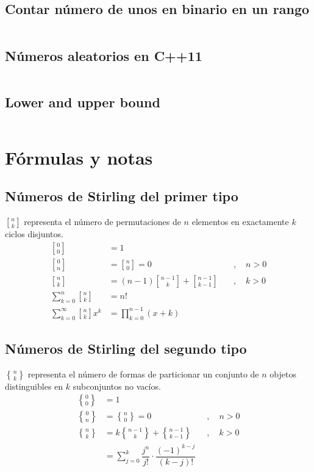 \documentclass[11pt]{article}
\newcommand{\genstirlingI}[3]{%
	\genfrac{[}{]}{0pt}{#1}{#2}{#3}%
}
\newcommand{\genstirlingII}[3]{%
	\genfrac{\{}{\}}{0pt}{#1}{#2}{#3}%
}
\newcommand{\stirlingI}[2]{\genstirlingI{}{#1}{#2}}
\newcommand{\stirlingII}[2]{\genstirlingII{}{#1}{#2}}
\begin{document}
		\subsection{Contar número de unos en binario en un rango}
		\inputminted[tabsize=2,breaklines,firstline=158,lastline=165,fontsize=\small]{c++}{misc.cpp}
		
		\subsection{Números aleatorios en C++11}
		\inputminted[tabsize=2,breaklines,firstline=167,lastline=180,fontsize=\small]{c++}{misc.cpp}
		
		\subsection{Lower and upper bound}
		\inputminted[tabsize=2,breaklines,firstline=182,lastline=186,fontsize=\small]{c++}{misc.cpp}
		
	\newpage
	\section{Fórmulas y notas}
		\subsection{Números de Stirling del primer tipo}
			$\stirlingI{n}{k}$ representa el número de permutaciones de $n$ elementos en exactamente $k$ ciclos disjuntos.
			\begin{align*}
				\stirlingI{0}{0} &= 1 \\
				\stirlingI{0}{n} &= \stirlingI{n}{0} = 0 \quad &, \quad n>0 \\
				\stirlingI{n}{k} &= (n-1)\stirlingI{n-1}{k} + \stirlingI{n-1}{k-1} \quad &, \quad k>0 \\
				\sum_{k=0}^{n} \stirlingI{n}{k} &= n! \\
				\sum_{k=0}^{\infty} \stirlingI{n}{k} x^k &= \prod_{k=0}^{n-1}(x+k)
			\end{align*}
		
		\subsection{Números de Stirling del segundo tipo}
			$\stirlingII{n}{k}$ representa el número de formas de particionar un conjunto de $n$ objetos distinguibles en $k$ subconjuntos no vacíos.
			\begin{align*}
				\stirlingII{0}{0} &= 1 \\
				\stirlingII{0}{n} &= \stirlingII{n}{0} = 0 \quad &, \quad n>0 \\
				\stirlingII{n}{k} &= k\stirlingII{n-1}{k} + \stirlingII{n-1}{k-1} \quad &, \quad k>0 \\
				&= \sum_{j=0}^{k} \dfrac{j^n}{j!} \cdot \dfrac{(-1)^{k-j}}{(k-j)!}
			\end{align*}
		
\end{document}
